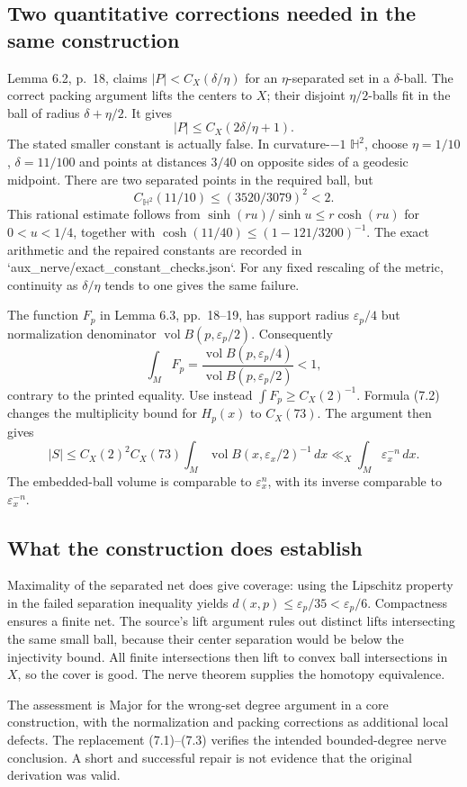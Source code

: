 \documentclass[10pt]{article}
\begin{document}
\subsection*{Two quantitative corrections needed in the same construction}
Lemma 6.2, p. 18, claims \(|P|<C_X(\delta/\eta)\) for an \(\eta\)-separated set in a \(\delta\)-ball. The correct packing argument lifts the centers to \(X\); their disjoint \(\eta/2\)-balls fit in the ball of radius \(\delta+\eta/2\). It gives \[|P|\le C_X(2\delta/\eta+1).
 \tag{7.2}\] The stated smaller constant is actually false. In curvature-\(-1\) \(\mathbb H^2\), choose \(\eta=1/10\), \(\delta=11/100\) and points at distances \(3/40\) on opposite sides of a geodesic midpoint. There are two separated points in the required ball, but \[C_{\mathbb H^2}(11/10)\le(3520/3079)^2<2.\] This rational estimate follows from \(\sinh(ru)/\sinh u\le r\cosh(ru)\) for \(0<u<1/4\), together with \(\cosh(11/40)\le(1-121/3200)^{-1}\). The exact arithmetic and the repaired constants are recorded in `aux\_nerve/exact\_constant\_checks.json`. For any fixed rescaling of the metric, continuity as \(\delta/\eta\) tends to one gives the same failure.\par
The function \(F_p\) in Lemma 6.3, pp. 18–19, has support radius \(\varepsilon_p/4\) but normalization denominator \(\operatorname{vol}B(p,\varepsilon_p/2)\). Consequently \[\int_M F_p=
 \frac{\operatorname{vol}B(p,\varepsilon_p/4)}{\operatorname{vol}B(p,\varepsilon_p/2)}
 <1,\] contrary to the printed equality. Use instead \(\int F_p\ge C_X(2)^{-1}\). Formula (7.2) changes the multiplicity bound for \(H_p(x)\) to \(C_X(73)\). The argument then gives \[|S|\le C_X(2)^2C_X(73)
 \int_M\operatorname{vol}B(x,\varepsilon_x/2)^{-1}\,dx
 \ll_X\int_M\varepsilon_x^{-n}\,dx.
 \tag{7.3}\] The embedded-ball volume is comparable to \(\varepsilon_x^n\), with its inverse comparable to \(\varepsilon_x^{-n}\).\par
\subsection*{What the construction does establish}
Maximality of the separated net does give coverage: using the Lipschitz property in the failed separation inequality yields \(d(x,p)\le\varepsilon_p/35<\varepsilon_p/6\). Compactness ensures a finite net. The source’s lift argument rules out distinct lifts intersecting the same small ball, because their center separation would be below the injectivity bound. All finite intersections then lift to convex ball intersections in \(X\), so the cover is good. The nerve theorem supplies the homotopy equivalence.\par
The assessment is Major for the wrong-set degree argument in a core construction, with the normalization and packing corrections as additional local defects. The replacement (7.1)–(7.3) verifies the intended bounded-degree nerve conclusion. A short and successful repair is not evidence that the original derivation was valid.\par
\end{document}
